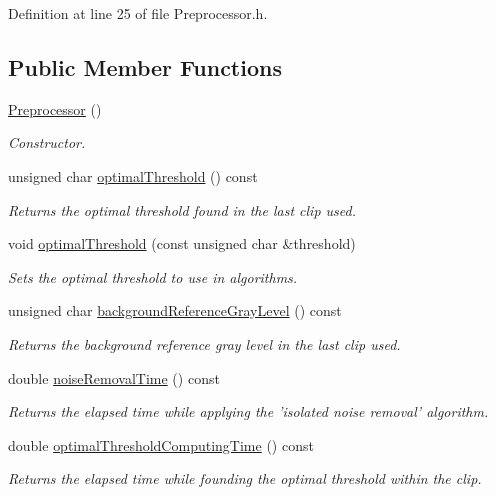 Definition at line 25 of file Preprocessor.h.\subsection*{Public Member Functions}
\begin{CompactItemize}
\item 
\hyperlink{class_preprocessor_da966c8b83e7c3bcd8759549c3cdf688}{Preprocessor} ()
\begin{CompactList}\small\item\em Constructor. \item\end{CompactList}\item 
unsigned char \hyperlink{class_preprocessor_1d8eaa1cf786941dbfa1eca95b46ce0c}{optimalThreshold} () const 
\begin{CompactList}\small\item\em Returns the optimal threshold found in the last clip used. \item\end{CompactList}\item 
void \hyperlink{class_preprocessor_1fc44d7d19944f3c3addd3a576c37414}{optimalThreshold} (const unsigned char \&threshold)
\begin{CompactList}\small\item\em Sets the optimal threshold to use in algorithms. \item\end{CompactList}\item 
unsigned char \hyperlink{class_preprocessor_9a2684181b5f43051fe53d7d2950dd36}{backgroundReferenceGrayLevel} () const 
\begin{CompactList}\small\item\em Returns the background reference gray level in the last clip used. \item\end{CompactList}\item 
double \hyperlink{class_preprocessor_0cccd23820430541f18f2b24dbfd0784}{noiseRemovalTime} () const 
\begin{CompactList}\small\item\em Returns the elapsed time while applying the 'isolated noise removal' algorithm. \item\end{CompactList}\item 
double \hyperlink{class_preprocessor_72dd29238c4202698e67dcb26a47f4b5}{optimalThresholdComputingTime} () const 
\begin{CompactList}\small\item\em Returns the elapsed time while founding the optimal threshold within the clip. \item\end{CompactList}\item 

\end{CompactItemize}
